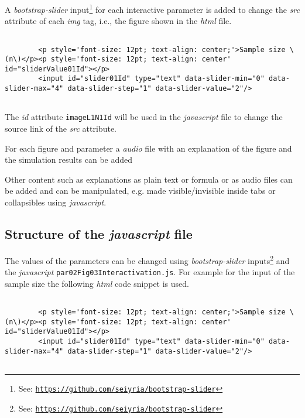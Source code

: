 \documentclass[12pt]{article}
\begin{document}
A \emph{bootstrap-slider} input\footnote{See: \href{https://github.com/seiyria/bootstrap-slider}{\texttt{https://github.com/seiyria/bootstrap-slider}}} for each interactive parameter is added to change the \emph{src} attribute of each \emph{img} tag, i.e., the figure shown in the \emph{html} file. 
%
\begin{CodeSnippet}[!hp]
	\centering
	\caption{\emph{Html} code snippet for slider 1}
	\tiny
	\vspace{0.25cm}
	\begin{BVerbatim}
		
		<p style='font-size: 12pt; text-align: center;'>Sample size \(n\)</p><p style='font-size: 12pt; text-align: center' id="sliderValue01Id"></p>
		<input id="slider01Id" type="text" data-slider-min="0" data-slider-max="4" data-slider-step="1" data-slider-value="2"/>
		
	\end{BVerbatim}
	\label{HtmlCodSniSli01}
\end{CodeSnippet}
%
The \emph{id} attribute \texttt{imageL1N1Id} will be used in the \emph{javascript} file to change the source link of the \emph{src} attribute. 


For each figure and parameter a \emph{audio} file with an explanation of the figure and the simulation results can be added

Other content such as explanations as plain text or formula or as audio files can be added and can be manipulated, e.g. made visible/invisible inside tabs or collapsibles using \emph{javascript}. 



\subsection{Structure of the \emph{javascript} file}\label{SecHowJs}

The values of the parameters can be changed using \emph{bootstrap-slider} inputs\footnote{See: \href{https://github.com/seiyria/bootstrap-slider}{\texttt{https://github.com/seiyria/bootstrap-slider}}} and the \emph{javascript} \texttt{par02Fig03Interactivation.js}. 
%
For example for the input of the sample size the following \emph{html} code snippet is used. 

\begin{CodeSnippet}[!hp]
	\centering
	\caption{\emph{Html} code snippet for \emph{bootstrap-slider} input}
	\tiny
	\vspace{0.25cm}
	\begin{BVerbatim}
		
		<p style='font-size: 12pt; text-align: center;'>Sample size \(n\)</p><p style='font-size: 12pt; text-align: center' id="sliderValue01Id"></p>
		<input id="slider01Id" type="text" data-slider-min="0" data-slider-max="4" data-slider-step="1" data-slider-value="2"/>
		
	\end{BVerbatim}
	\label{HtmlCodSniBsInput}
\end{CodeSnippet}
\end{document}
